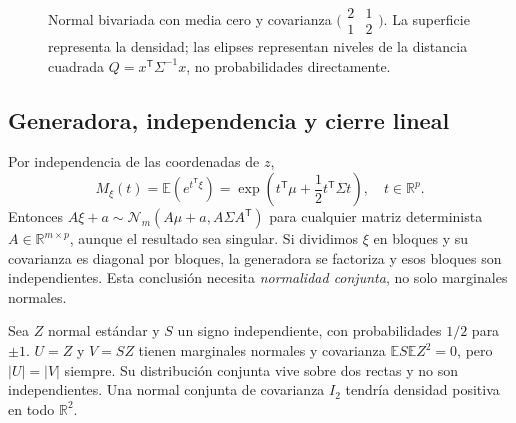 \documentclass[11pt,a4paper]{article}
\newcommand{\R}{\mathbb R}
\newcommand{\E}{\mathbb E}
\newcommand{\T}{^{\mathsf T}}
\theoremstyle{definition}
\begin{document}
\begin{figure}[H]\centering
{}\hfill
{}
\caption{Normal bivariada con media cero y covarianza $\bigl(\begin{smallmatrix}2&1\\1&2\end{smallmatrix}\bigr)$. La superficie representa la densidad; las elipses representan niveles de la distancia cuadrada $Q=x\T\Sigma^{-1}x$, no probabilidades directamente.}
\end{figure}

\subsection{Generadora, independencia y cierre lineal}
Por independencia de las coordenadas de $z$,
\[
M_\xi(t)=\E(e^{t\T\xi})=\exp\!\left(t\T\mu+\frac12t\T\Sigma t\right),
\quad t\in\R^p.
\]
Entonces $A\xi+a\sim\mathcal N_m(A\mu+a,A\Sigma A\T)$ para cualquier matriz determinista $A\in\R^{m\times p}$, aunque el resultado sea singular. Si dividimos $\xi$ en bloques y su covarianza es diagonal por bloques, la generadora se factoriza y esos bloques son independientes. Esta conclusión necesita \emph{normalidad conjunta}, no solo marginales normales.
\begin{cuidado}
Sea $Z$ normal estándar y $S$ un signo independiente, con probabilidades $1/2$ para $\pm1$. $U=Z$ y $V=SZ$ tienen marginales normales y covarianza $\E S\E Z^2=0$, pero $|U|=|V|$ siempre. Su distribución conjunta vive sobre dos rectas y no son independientes. Una normal conjunta de covarianza $I_2$ tendría densidad positiva en todo $\R^2$.
\end{cuidado}
\end{document}

